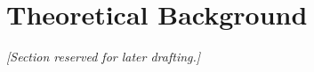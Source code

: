 \section{Theoretical Background}\label{sec:theoretical_background}

\noindent\textit{[Section reserved for later drafting.]}

